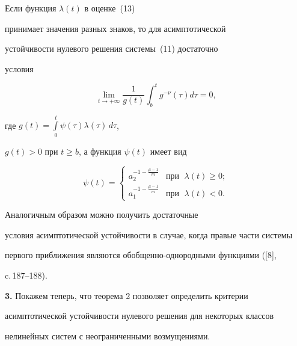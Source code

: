 \begin{note}


Если функция $\lambda(t)$ в оценке~(13)


принимает значения разных знаков, то для асимптотической


устойчивости нулевого решения системы~(11) достаточно


условия


$$


\lim_{t\to +\infty} \frac{1}{g(t)} \int_b^{t}


g^{-\nu}(\tau) d\tau =0,


$$


где $g(t)=\int\limits_0^{t} \psi(\tau) \lambda(\tau)\,d\tau$,


$g(t)>0$ при $t\geq b$, а функция $\psi(t)$ имеет вид


$$


\psi(t)=


\begin{cases}


a_2^{-1-\frac{\mu-1}{m}} & \text{при } \; \lambda(t)\geq 0; \\


a_1^{-1-\frac{\mu-1}{m}} & \text{при } \; \lambda(t)< 0.


\end{cases}


$$


\end{note}





\begin{note}


Аналогичным образом можно получить достаточные


условия асимптотической устойчивости в случае, когда правые части системы


первого приближения являются обобщенно-однородными функциями ([8],


c.\,187--188).


\end{note}





{\bf 3.} Покажем теперь, что теорема 2 позволяет определить критерии


асимптотической устойчивости нулевого решения для некоторых классов


нелинейных систем с неограниченными возмущениями.





